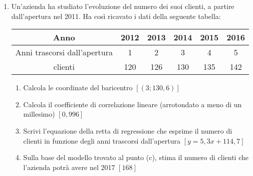 \begin{enumerate}
\item Un'azienda ha studiato l'evoluzione del numero dei suoi clienti, a 
partire dall'apertura nel 2011. Ha così ricavato i dati della seguente 
tabella:\\
\begin{tabular}{|c|c|c|c|c|c|}
        \hline
Anno&   2012&   2013&   2014    &2015&  2016\\
\hline
Anni trascorsi dall'apertura&   1       &2      &3&     4&      5\\
\hline
clienti&        120&    126&    130&    135&    142\\
\hline
        
\end{tabular}


\begin{enumerate}
        \item Calcola le coordinate del baricentro \hfill $[(3;130,6)]$
        \item Calcola il coefficiente di correlazione lineare (arrotondato 
a meno di un millesimo) \hfill $[0,996]$
        \item Scrivi l'equazione della retta di regressione che esprime il 
numero di clienti in funzione degli anni trascorsi dall'apertura \hfill 
$[y=5,3x+114,7]$
        \item Sulla base del modello trovato al punto (c), stima il  numero 
di clienti che l'azienda potrà avere nel 2017 \hfill $[168]$
\end{enumerate}
\end{enumerate}

